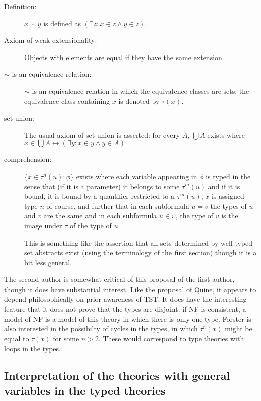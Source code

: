 \documentclass[12pt]{article}
\begin{document}
\begin{description}

\item[Definition:]  $x \sim y$ is defined as $(\exists z:x \in z \wedge y \in z)$.

\item[Axiom of weak extensionality:]  Objects with elements are equal if they have the same extension.

\item[$\sim$ is an equivalence relation:]  $\sim$ is an equivalence relation in which the equivalence classes are sets:  the equivalence class containing $x$ is denoted by $\tau(x)$.

\item[set union:]  The usual axiom of set union is asserted:  for every $A$, $\bigcup A$ exists where $x \in \bigcup A \leftrightarrow (\exists y:x \in y \wedge y \in A)$

\item[comprehension:]  $\{x \in \tau^n(u):\phi\}$ exists
where each variable appearing in $\phi$ is typed in the sense that
(if it is a parameter) it belongs to some $\tau^m(u)$ and if it is bound, it is bound by a quantifier restricted to a $\tau^m(u)$, $x$ is assigned type $n$ of course, and further that in each subformula $u=v$ the types of $u$ and $v$ are the same and in each subformula $u \in v$, the type of $v$ is the image under $\tau$ of the type of $u$.

This is something like the assertion that all sets determined by well typed set abstracts exist (using the terminology of the first section) though it is a bit less general.


\end{description}

The second author is somewhat critical of this proposal of the first author, though it does have substantial interest.  Like the proposal of Quine, it appears to depend philosophically on prior awareness of TST.  It does have the interesting feature that it does not prove that the types are disjoint:  if NF is consistent, a model of NF is a model of this theory in which there is only one type.  Forster is also interested in the possibilty of cycles in the types, in which $\tau^n(x)$ might be equal to $\tau(x)$ for some $n>2$.  These would correspond to type theories with loops in the types.

\subsection{Interpretation of the theories with general variables in the typed theories}
\end{document}
